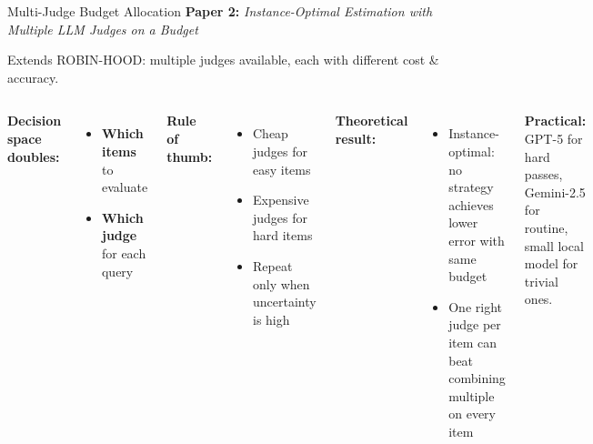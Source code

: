 \documentclass[11pt, aspectratio=169]{beamer}
\begin{document}
\begin{frame}{Multi-Judge Budget Allocation}
  \textbf{Paper 2:} \textit{Instance-Optimal Estimation with Multiple LLM Judges on a Budget}

  \vspace{0.1cm}
  Extends ROBIN-HOOD: multiple judges available, each with \alert{different cost \& accuracy}.

  \vspace{0.1cm}
  \begin{columns}[T]
      \textbf{Decision space doubles:}
      \begin{itemize}\footnotesize
        \item \textbf{Which items} to evaluate
        \item \textbf{Which judge} for each query
      \end{itemize}
      \vspace{0.1cm}
      \textbf{Rule of thumb:}
      \begin{itemize}\footnotesize
        \item Cheap judges for easy items
        \item Expensive judges for hard items
        \item Repeat only when uncertainty is high
      \end{itemize}

      \textbf{Theoretical result:}
      \begin{itemize}\footnotesize
        \item \alert{Instance-optimal}: no strategy achieves
          lower error with same budget
        \item One right judge per item can beat
          combining multiple on every item
      \end{itemize}
      \vspace{0.1cm}
      \textbf{Practical:} GPT-5 for hard passes, Gemini-2.5 for
      routine, small local model for trivial ones.
  \end{columns}
\end{frame}
\end{document}
